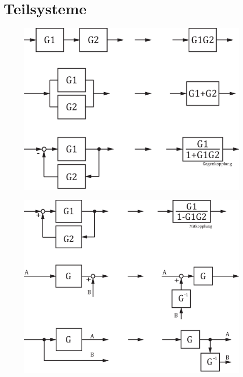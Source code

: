 



\chapter{Teilsysteme}

\begin{center}
\begin{figure}[ht]
	\includegraphics[scale = 0.62]{images/teilsysteme_p1.eps}
\end{figure}
\end{center}
\begin{center}
	\begin{figure}[ht]
	\includegraphics[scale = 0.62]{images/teilsysteme_p2.eps}
	\end{figure}
\end{center}

